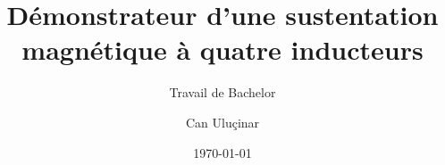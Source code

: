 \author{Can Uluçinar}

\setmale

\title{Démonstrateur d'une sustentation magnétique à quatre inducteurs}

\subtitle{Travail de Bachelor}


\date{\today}

